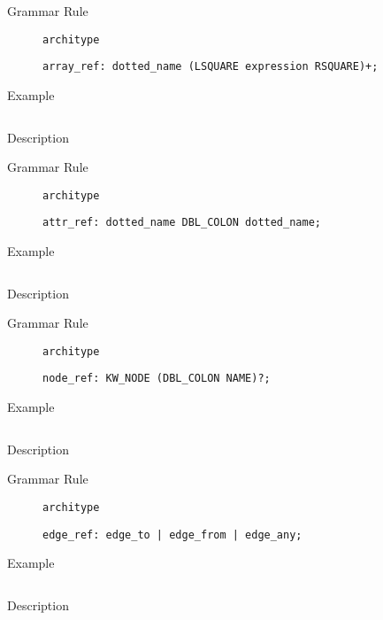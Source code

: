 \begin{description}
    \item[Grammar Rule] \texttt{architype}
          \begin{lstlisting}[style=gram]
array_ref: dotted_name (LSQUARE expression RSQUARE)+;
\end{lstlisting}
    \item[Example] \texttt{}
          \begin{lstlisting}
    \end{lstlisting}

    \item[Description]
\end{description}


\begin{description}
    \item[Grammar Rule] \texttt{architype}
          \begin{lstlisting}[style=gram]
attr_ref: dotted_name DBL_COLON dotted_name;
\end{lstlisting}
    \item[Example] \texttt{}
          \begin{lstlisting}
    \end{lstlisting}

    \item[Description]
\end{description}


\begin{description}
    \item[Grammar Rule] \texttt{architype}
          \begin{lstlisting}[style=gram]
node_ref: KW_NODE (DBL_COLON NAME)?;
\end{lstlisting}
    \item[Example] \texttt{}
          \begin{lstlisting}
    \end{lstlisting}

    \item[Description]
\end{description}


\begin{description}
    \item[Grammar Rule] \texttt{architype}
          \begin{lstlisting}[style=gram]
edge_ref: edge_to | edge_from | edge_any;
\end{lstlisting}
    \item[Example] \texttt{}
          \begin{lstlisting}
    \end{lstlisting}

    \item[Description]
\end{description}


